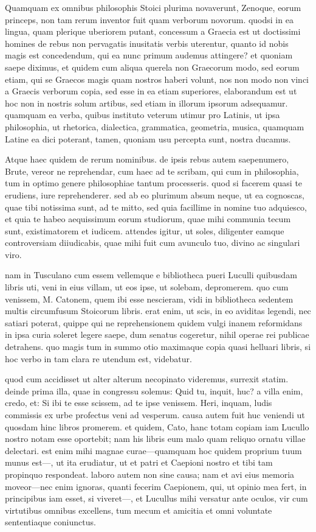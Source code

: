  Quamquam ex omnibus philosophis Stoici plurima novaverunt, Zenoque, eorum princeps, non tam rerum inventor fuit quam verborum novorum. quodsi in ea lingua, quam plerique uberiorem putant, concessum a Graecia est ut doctissimi homines de rebus non pervagatis inusitatis verbis uterentur, quanto id nobis magis est concedendum, qui ea nunc primum audemus attingere? et quoniam saepe diximus, et quidem cum aliqua querela non Graecorum modo, sed eorum etiam, qui se Graecos magis quam nostros haberi volunt, nos non modo non vinci a Graecis verborum copia, sed esse in ea etiam superiores, elaborandum est ut hoc non in nostris solum artibus, sed etiam in illorum ipsorum adsequamur. quamquam ea verba, quibus instituto veterum utimur pro Latinis, ut ipsa philosophia, ut rhetorica, dialectica, grammatica, geometria, musica, quamquam Latine ea dici poterant, tamen, quoniam usu percepta sunt, nostra ducamus.

 Atque haec quidem de rerum nominibus. de ipsis rebus autem saepenumero, Brute, vereor ne reprehendar, cum haec ad te scribam, qui cum in philosophia, tum in optimo genere philosophiae tantum processeris. quod si facerem quasi te erudiens, iure reprehenderer. sed ab eo plurimum absum neque, ut ea cognoscas, quae tibi notissima sunt, ad te mitto, sed quia facillime in nomine tuo adquiesco, et quia te habeo aequissimum eorum studiorum, quae mihi communia tecum sunt, existimatorem et iudicem. attendes igitur, ut soles, diligenter eamque controversiam diiudicabis, quae mihi fuit cum avunculo tuo, divino ac singulari viro.

 nam in Tusculano cum essem vellemque e bibliotheca pueri Luculli quibusdam libris uti, veni in eius villam, ut eos ipse, ut solebam, depromerem. quo cum venissem, M. Catonem, quem ibi esse nescieram, vidi in bibliotheca sedentem multis circumfusum Stoicorum libris. erat enim, ut scis, in eo aviditas legendi, nec satiari poterat, quippe qui ne reprehensionem quidem vulgi inanem reformidans in ipsa curia soleret legere saepe, dum senatus cogeretur, nihil operae rei publicae detrahens. quo magis tum in summo otio maximaque copia quasi helluari libris, si hoc verbo in tam clara re utendum est, videbatur.

 quod cum accidisset ut alter alterum necopinato videremus, surrexit statim. deinde prima illa, quae in congressu solemus: Quid tu, inquit, huc? a villa enim, credo, et: Si ibi te esse scissem, ad te ipse venissem. Heri, inquam, ludis commissis ex urbe profectus veni ad vesperum. causa autem fuit huc veniendi ut quosdam hinc libros promerem. et quidem, Cato, hanc totam copiam iam Lucullo nostro notam esse oportebit; nam his libris eum malo quam reliquo ornatu villae delectari. est enim mihi magnae curae—quamquam hoc quidem proprium tuum munus est—, ut ita erudiatur, ut et patri et Caepioni nostro et tibi tam propinquo respondeat. laboro autem non sine causa; nam et avi eius memoria moveor—nec enim ignoras, quanti fecerim Caepionem, qui, ut opinio mea fert, in principibus iam esset, si viveret—, et Lucullus mihi versatur ante oculos, vir cum virtutibus omnibus excellens, tum mecum et amicitia et omni voluntate sententiaque coniunctus.

